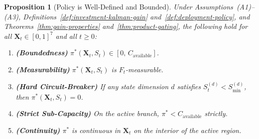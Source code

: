 \documentclass[12pt,openany]{book}
\newcommand{\calF}{\mathcal{F}}
\numberwithin{equation}{chapter}
\theoremstyle{plain}
\newtheorem{proposition}[theorem]{Proposition}
\theoremstyle{definition}
\theoremstyle{remark}
\def\mathcal#1{#1}%
\begin{document}
\begin{proposition}[Policy is Well-Defined and Bounded]
\label{prop:policy-bounded}
Under Assumptions~(A1)--(A3),
Definitions~\ref{def:investment-kalman-gain}
and~\ref{def:deployment-policy},
and Theorems~\ref{thm:gain-properties}
and~\ref{thm:product-gating}, the following hold for all
$\mathbf{X}_t \in [0,1]^7$ and all $t \geq 0$:
\begin{enumerate}
  \item \textbf{(Boundedness)}
        $\pi^*(\mathbf{X}_t, S_t) \in [0,\, C_{\mathrm{available}}]$.
  \item \textbf{(Measurability)}
        $\pi^*(\mathbf{X}_t, S_t)$ is $\calF_t$-measurable.
  \item \textbf{(Hard Circuit-Breaker)}
        If any state dimension $d$ satisfies
        $\mathcal{S}_t^{(d)} < \mathcal{S}_{\min}^{(d)}$,
        then $\pi^*(\mathbf{X}_t, S_t) = 0$.
  \item \textbf{(Strict Sub-Capacity)}
        On the active branch, $\pi^* < C_{\mathrm{available}}$
        strictly.
  \item \textbf{(Continuity)}
        $\pi^*$ is continuous in $\mathbf{X}_t$ on the interior
        of the active region.
\end{enumerate}
\end{proposition}
\end{document}
